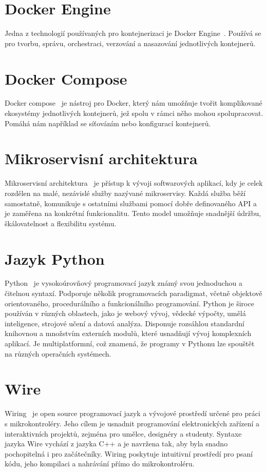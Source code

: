 \section{Docker Engine}\label{sec:docker-engine}
Jedna z technologií používaných pro kontejnerizaci je Docker Engine~\cite{kontejnerizace-docker}.
Používá se pro tvorbu, správu, orchestraci, verzování a nasazování jednotlivých kontejnerů.

\section{Docker Compose}\label{sec:docker-compose}
Docker compose~\cite{kontejnerizace-docker-compose} je nástroj pro Docker, který nám umožňuje tvořit komplikované ekosystémy jednotlivých kontejnerů, jež spolu v rámci něho mohou spolupracovat.
Pomáhá nám například se síťováním nebo konfigurací kontejnerů.

\section{Mikroservisní architektura}\label{sec:microservice-architecture}
Mikroservisní architektura~\cite{mikroservisy} je přístup k vývoji softwarových aplikací, kdy je celek rozdělen na malé, nezávislé služby nazývané mikroservisy.
Každá služba běží samostatně, komunikuje s ostatními službami pomocí dobře definovaného API a je zaměřena na konkrétní funkcionalitu.
Tento model umožňuje snadnější údržbu, škálovatelnost a flexibilitu systému.

\section{Jazyk Python}\label{sec:python}
Python~\cite{python} je vysokoúrovňový programovací jazyk známý svou jednoduchou a čitelnou syntaxí.
Podporuje několik programovacích paradigmat, včetně objektově orientovaného, procedurálního a funkcionálního programování.
Python je široce používán v různých oblastech, jako je webový vývoj, vědecké výpočty, umělá inteligence, strojové učení a datová analýza.
Disponuje rozsáhlou standardní knihovnou a množstvím externích modulů, které usnadňují vývoj komplexních aplikací.
Je multiplatformní, což znamená, že programy v Pythonu lze spouštět na různých operačních systémech.

\section{Wire}\label{sec:wiring}
Wiring~\cite{wire} je open source programovací jazyk a vývojové prostředí určené pro práci s mikrokontroléry.
Jeho cílem je usnadnit programování elektronických zařízení a interaktivních projektů, zejména pro umělce, designéry a studenty.
Syntaxe jazyka Wire vychází z jazyka C++ a je navržena tak, aby byla snadno pochopitelná i pro začátečníky.
Wiring poskytuje intuitivní prostředí pro psaní kódu, jeho kompilaci a nahrávání přímo do mikrokontroléru.

